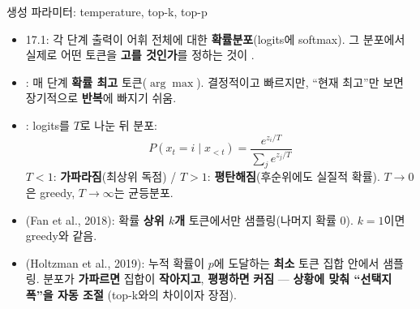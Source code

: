 \begin{frame}{생성 파라미터: temperature, top-k, top-p}
  \begin{itemize}
    \item 17.1: 각 단계 출력이 어휘 전체에 대한
      \textbf{확률분포}(logits에 softmax). 그 분포에서
      실제로 어떤 토큰을 \textbf{고를 것인가}를 정하는
      것이 .
    \item {}: 매 단계 \textbf{확률 최고}
      토큰($\arg\max$). 결정적이고 빠르지만, ``현재
      최고''만 보면 장기적으로 \textbf{반복}에 빠지기
      쉬움.
    \item {}: logits를 $T$로 나눈 뒤 분포:
      \[P(x_t = i \mid x_{<t}) = \frac{e^{z_i / T}}{\sum_j e^{z_j / T}}\]
      $T<1$: \textbf{가파라짐}(최상위 독점) / $T>1$:
      \textbf{평탄해짐}(후순위에도 실질적 확률).
      $T \to 0$은 greedy, $T \to \infty$는 균등분포.
    \item {}(Fan et al., 2018): 확률 \textbf{상위
      $k$개} 토큰에서만 샘플링(나머지 확률 0). $k=1$이면
      greedy와 같음.
    \item {}(Holtzman et al.,
      2019): 누적 확률이 $p$에 도달하는 \textbf{최소} 토큰
      집합 안에서 샘플링. 분포가 \textbf{가파르면} 집합이
      \textbf{작아지고}, \textbf{평평하면} \textbf{커짐} —
      \textbf{상황에 맞춰 ``선택지 폭''을 자동 조절}
      (top-k와의 차이이자 장점).
  \end{itemize}
\end{frame}
